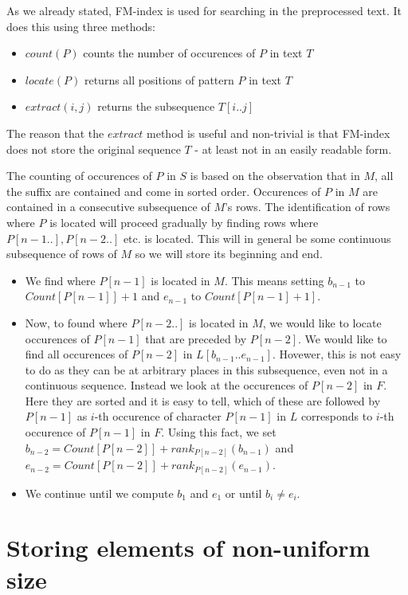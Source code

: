 As we already stated, FM-index is used for searching in the preprocessed text.
It does this using three methods:

\begin{itemize}
	\item $count(P)$ counts the number of occurences of $P$ in text $T$
	\item $locate(P)$ returns all positions of pattern $P$ in text $T$
	\item $extract(i, j)$ returns the subsequence $T[i..j]$
\end{itemize}

The reason that the $extract$ method is useful and non-trivial is that FM-index
does not store the original sequence $T$ - at least not in an easily readable form.

The counting of occurences of $P$ in $S$ is based on the observation that in $M$,
all the suffix are contained and come in sorted order. Occurences of $P$ in $M$
are contained in a consecutive subsequence of $M$'s rows. The identification of
rows where $P$ is located will proceed gradually by finding rows where $P[n-1..],
P[n-2..]$ etc. is located. This will in general be some continuous subsequence of
rows of $M$ so we will store its beginning and end.

\begin{itemize}
	\item We find where $P[n-1]$ is located in $M$. This means setting $b_{n-1}$ to
	$Count[P[n-1]]+1$ and $e_{n-1}$ to $Count[P[n-1]+1]$.
	\item Now, to found where $P[n-2..]$ is located in $M$, we would like to locate
	occurences of $P[n-1]$ that are preceded by $P[n-2]$. We would like to find all
	occurences of $P[n-2]$ in $L[b_{n-1}..e_{n-1}]$. Hovewer, this is not easy to do
	as they can be at arbitrary places in this subsequence, even not in a continuous
	sequence. Instead we look at the occurences of $P[n-2]$ in $F$. Here they are
	sorted and it is easy to tell, which of these are followed by $P[n-1]$ as $i$-th
	occurence of character $P[n-1]$ in $L$ corresponds to $i$-th occurence of $P[n-1]$
	in $F$. Using this fact, we set
	$b_{n-2} = Count[P[n-2]] + rank_{P[n-2]}(b_{n-1})$ and
	$e_{n-2} = Count[P[n-2]] + rank_{P[n-2]}(e_{n-1})$.
	\item We continue until we compute $b_1$ and $e_1$ or until $b_i\neq e_i$.
\end{itemize}

\section{Storing elements of non-uniform size}

